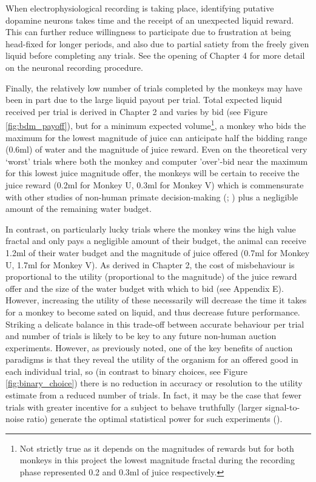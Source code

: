 When electrophysiological recording is taking place, identifying putative dopamine neurons takes time and the receipt of an unexpected liquid reward. This can further reduce willingness to participate due to frustration at being head-fixed for longer periods, and also due to partial satiety from the freely given liquid before completing any trials. See the opening of Chapter 4 for more detail on the neuronal recording procedure.

Finally, the relatively low number of trials completed by the monkeys may have been in part due to the large liquid payout per trial. Total expected liquid received per trial is derived in Chapter 2 and varies by bid (see Figure \ref{fig:bdm_payoff}), but for a minimum expected volume\footnote{Not strictly true as it depends on the magnitudes of rewards but for both monkeys in this project the lowest magnitude fractal during the recording phase represented 0.2 and 0.3ml of juice respectively.}, a monkey who bids the maximum for the lowest magnitude of juice can anticipate half the bidding range (0.6ml) of water and the magnitude of juice reward. Even on the theoretical very ‘worst’ trials where both the monkey and computer 'over'-bid near the maximum for this lowest juice magnitude offer, the monkeys will be certain to receive the juice reward (0.2ml for Monkey U, 0.3ml for Monkey V) which is commensurate with other studies of non-human primate decision-making (\cite{ferraritonioloNonhumanPrimatesSatisfy2021}; \cite{pastorMonkeysChooseIf2017}) plus a negligible amount of the remaining water budget.

In contrast, on particularly lucky trials where the monkey wins the high value fractal and only pays a negligible amount of their budget, the animal can receive 1.2ml of their water budget and the magnitude of juice offered (0.7ml for Monkey U, 1.7ml for Monkey V). As derived in Chapter 2, the cost of misbehaviour is proportional to the utility (proportional to the magnitude) of the juice reward offer and the size of the water budget with which to bid (see Appendix E). However, increasing the utility of these necessarily will decrease the time it takes for a monkey to become sated on liquid, and thus decrease future performance. Striking a delicate balance in this trade-off between accurate behaviour per trial and number of trials is likely to be key to any future non-human auction experiments. However, as previously noted, one of the key benefits of auction paradigms is that they reveal the utility of the organism for an offered good in each individual trial, so (in contrast to binary choices, see Figure \ref{fig:binary_choice}) there is no reduction in accuracy or resolution to the utility estimate from a reduced number of trials. In fact, it may be the case that fewer trials with greater incentive for a subject to behave truthfully (larger signal-to-noise ratio) generate the optimal statistical power for such experiments (\cite{peruginiPracticalPrimerPower2018}).

